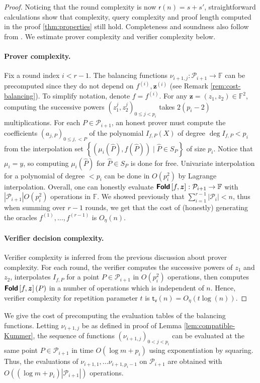 \documentclass[10pt,a4paper]{article}
\renewcommand\hat{\widehat}
\newcommand\F{\mathbb{F}}
\newcommand\fold[1]{\textsf{\textbf{Fold}}\left[#1\right]}
\renewcommand{\hat}{\widehat}
\renewcommand{\vec}[1]{\boldsymbol{#1}}
\newcommand{\set}[1]{\left\{#1\right\}}
\newcommand{\size}[1]{\left|#1\right|}
\newcommand\bfz{{\vec{z}}}
\newcommand\calP{\mathcal{P}}
\newcommand\xpi[1]{#1^{(i)}}
\providecommand{\proofsubparagraph}{\paragraph}
\theoremstyle{plain}
\theoremstyle{plain}
\theoremstyle{definition}
\theoremstyle{remark}
\theoremstyle{plain}
\begin{document}
\begin{proof}   
	Noticing that the round complexity is now $\mathsf{r}(n) = s + s'$, straightforward calculations show that complexity, query complexity and proof length computed in the proof \ref{thm:properties} still hold. Completeness and soundness also follow from \cite{ABN21}.
	We estimate prover complexity and verifier complexity below.
	
	\proofsubparagraph*{Prover complexity.}
	Fix a round index $i < r - 1$. The balancing functions $\nu_{i+1, j} : \calP_{i+1} \rightarrow \F$ can be precomputed since they do not depend on $f^{(i)}, \bfz^{(i)}$ (see Remark \ref{rem:cost-balancing}).       
	To simplify notation, denote $f = \xpi{f}$. For any $\bfz = (z_1, z_2) \in \F^2$, computing the successive powers $(z_1^j, z_2^j)_{0 \le j < p_i}$ takes $2(p_i - 2)$ multiplications.         
	For each $P \in \calP_{i+1}$, an honest prover must compute the coefficients $(a_{j,P})_{0 \le j, < P}$ of the polynomial $I_{f, P}(X)$ of degree $\deg I_{f,P} < p_i$ from the interpolation set $\set{(\mu_i(\hat P), f(\hat P)) \mid \hat P \in S_{P}}$ of size $p_i$. Notice that $\mu_i = y$, so computing $\mu_i(\hat P)$ for $\hat P \in S_P$ is done for free. Univariate interpolation for a polynomial of degree $<p_i$ can be done in $O(p_i^2)$ by Lagrange interpolation.    
	Overall, one can honestly evaluate $\fold{f, \bfz} : \calP_{i + 1} \rightarrow \F$ with $\size{\calP_{i+1}}O(p_i^2)$ operations in $\F$. We showed previously that $\sum_{i=1}^{r - 1}\size{\calP_i} < n$, thus when summing over $r - 1$ rounds, we get that the cost of (honestly) generating the oracles $f^{(1)}, \ldots, f^{(r - 1)}$ is $O_{\eta }(n)$.        
	
	\proofsubparagraph*{Verifier decision complexity.} 
	
	Verifier complexity is inferred from the previous discussion about prover complexity. For each round, the verifier computes the successive powers of $z_1$ and $z_2$, interpolates $I_{f,P}$ for a point $P \in \calP_{i+1}$ in $O(p_i^2)$ operations, then computes $\fold{f, \bfz}(P)$ in a number of operations which is independent of $n$. Hence, verifier complexity for repetition parameter $t$ is $\mathsf{t_v}(n) = O_{\eta}(t\log(n))$.   
\end{proof}


\begin{remark}\label{rem:cost-balancing}
	We give the cost of precomputing the evaluation tables of the balancing functions. Letting $\nu_{i+1, j}$ be as defined in proof of Lemma \ref{lem:compatible-Kummer}, the sequence of functions $(\nu_{i+1, j})_{0 < j < p_i}$ can be evaluated at the same point $P \in \calP_{i + 1}$ in time $O(\log m + p_i)$ using exponentiation by squaring. Thus, the evaluations of $\nu_{i+1, 1}, \dots \nu_{i+1, p_i - 1}$ on $\calP_{i+1}$ are obtained with $O((\log m + p_i)\size{\calP_{i+1}})$ operations.
\end{remark}
\end{document}
